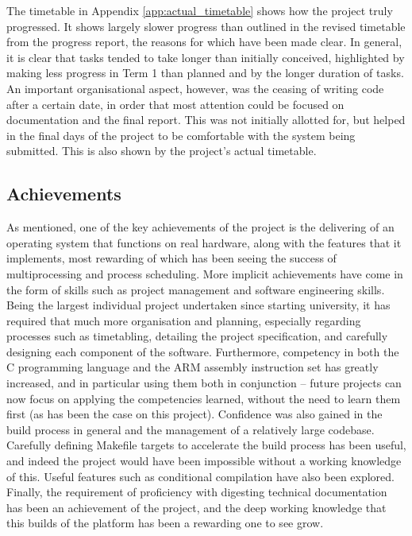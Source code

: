     The timetable in Appendix \ref{app:actual_timetable} shows how the project
    truly progressed. It shows largely slower progress than outlined in the
    revised timetable from the progress report, the reasons for which have been
    made clear. In general, it is clear that tasks tended to take longer than
    initially conceived, highlighted by making less progress in Term 1 than
    planned and by the longer duration of tasks. An important organisational
    aspect, however, was the ceasing of writing code after a certain date, in
    order that most attention could be focused on documentation and the final
    report. This was not initially allotted for, but helped in the final days of
    the project to be comfortable with the system being submitted. This is also
    shown by the project's actual timetable.

\subsection{Achievements}
    As mentioned, one of the key achievements of the project is the delivering
    of an operating system that functions on real hardware, along with the
    features that it implements, most rewarding of which has been seeing the
    success of multiprocessing and process scheduling. More implicit
    achievements have come in the form of skills such as project management and
    software engineering skills. Being the largest individual project undertaken
    since starting university, it has required that much more organisation and
    planning, especially regarding processes such as timetabling, detailing the
    project specification, and carefully designing each component of the
    software. Furthermore, competency in both the C programming language and the
    ARM assembly instruction set has greatly increased, and in particular using
    them both in conjunction -- future projects can now focus on applying the
    competencies learned, without the need to learn them first (as has been the
    case on this project). Confidence was also gained in the build process in
    general and the management of a relatively large codebase. Carefully
    defining Makefile targets to accelerate the build process has been useful,
    and indeed the project would have been impossible without a working
    knowledge of this. Useful features such as conditional compilation have
    also been explored. Finally, the requirement of proficiency with digesting
    technical documentation has been an achievement of the project, and the deep
    working knowledge that this builds of the platform has been a rewarding one
    to see grow.
    
